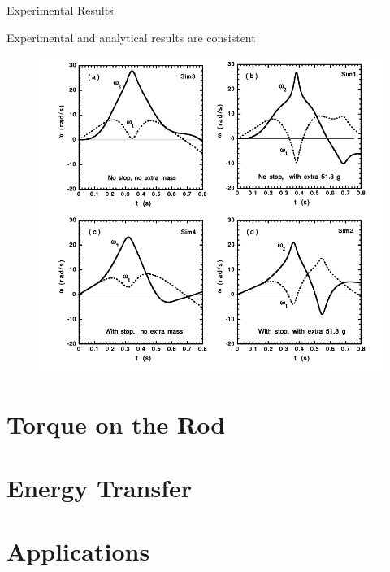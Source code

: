 \documentclass[tikz]{beamer}
\begin{document}
\begin{frame} {Experimental Results}
	\only<5> {
		Experimental and analytical results are consistent
		\begin{figure}
			\centering
			\includegraphics[scale=0.25]{analyticalresults.png}
		\end{figure}
	}

\end{frame}

\section{Torque on the Rod}


\section{Energy Transfer}

\section{Applications}

\end{document}
